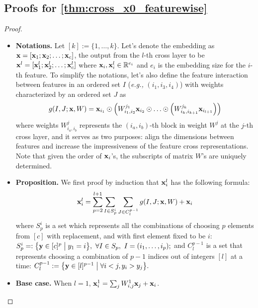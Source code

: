 \documentclass[sigconf]{acmart}
\newcommand{\vecx}{{\bf x}}
\newcommand{\vecy}{{\bf y}}
\begin{document}
\subsection{Proofs for \autoref{thm:cross_x0_featurewise}}
\begin{proof}

\begin{itemize}[leftmargin=0em]
We start with notations; then prove by induction.
\item[] {\bf Notations.}
Let $[k] := \{1, \ldots, k\}$. Let's denote the embedding as $\vecx = [\vecx_1; \vecx_2; \ldots; \vecx_c]$, the output from the $l$-th cross layer to be $\vecx^l = [\vecx_1^l; \vecx_2^l; \ldots; \vecx_c^l]$ where $\vecx_i, \vecx_i^l \in \mathbb{R}^{e_i}$ and $e_i$ is the embedding size for the $i$-th feature. 
To simplify the notations, let's also define the feature interaction between features in an ordered set $I$ (\emph{e.g.,} $(i_1, i_3, i_4)$) with weights characterized by an ordered set $J$ as
\begin{equation}
\label{eq:interaction_g}
g(I, J; \vecx, W) = \vecx_{i_1} \odot \left(W_{i_1, i_2}^{j_1} \vecx_{i_2} \odot \ldots \odot \left(W_{i_k, i_{k+1}}^{j_{k}} \vecx_{i_{l+1}}\right) \right)
\end{equation}
where weights $W_{i_a, i_b}^j$ represents the $(i_a, i_b)$-th block in weight $W^j$ at the $j$-th cross layer, and it serves as two purposes: align the dimensions between features and increase the impressiveness of the feature cross representations. Note that given the order of $\vecx_i$'s, the subscripts of matrix $W$'s are uniquely determined.


\item[] {\bf Proposition.} We first proof by induction that $\vecx_i^l$ has the following formula:
\begin{equation}
\label{eq:general_form_x_i}
\vecx_i^l = \sum_{p=2}^{l+1} \sum_{I \in S_p^i} \sum_{J \in C_l^{p-1}} g(I, J; \vecx, W) + \vecx_{i}
\end{equation}
where $S_p^i$ is a set which represents all the combinations of choosing $p$ elements from $[c]$ with replacement, and with first element fixed to be $i$: $S_p^i =: \bigl\{\vecy \in [c]^{p} \mathrel{\big|} y_1 = i\bigr\}, ~\forall I \in S_p, ~I = (i_1, \ldots, i_p);$
and $C_l^{p-1}$ is a set that represents choosing a combination of $p-1$ indices out of integers $[l]$ at a time:
$C_l^{p-1} := \bigl\{\vecy \in [l]^{p-1} \mathrel{\big|} \forall i < j, y_i > y_j  \bigr\}.$

\item[] {\bf Base case.} When $l=1$, $\vecx_i^1 = \sum_j W_{i,j}^{1} \vecx_j + \vecx_i$.


\end{itemize}
\end{proof}
\end{document}
